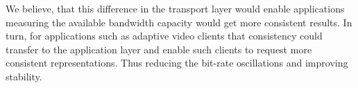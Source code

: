 \documentclass[10pt,sigconf]{acmart}
\begin{document}
We believe, that this difference in the transport layer would enable applications measuring the available bandwidth capacity would get more consistent results. In turn, for applications such as adaptive video clients that consistency could transfer to the application layer and enable such clients to request more consistent representations. Thus reducing the bit-rate oscillations and improving stability.





\end{document}
